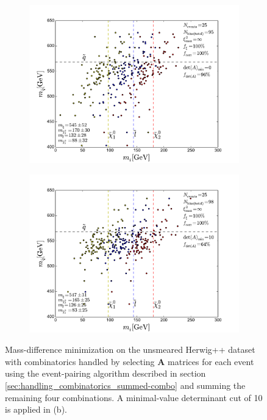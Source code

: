 \documentclass[twoside,english]{uiofysmaster}
\begin{document}
\begin{figure}[hbt]
	\centering
	\begin{subfigure}[b]{0.45\textwidth}
		\includegraphics[width=\textwidth]{figures/improving_combinatorics/herwigpp_nosmear_nodetAcut_A_matrix_algorithm_4combosum_TMP.pdf} 
		\caption{ }
		\label{fig:event-pair-A-selection_4combosum_a}
	\end{subfigure}
	\begin{subfigure}[b]{0.45\textwidth}
		\includegraphics[width=\textwidth]{figures/improving_combinatorics/herwigpp_nosmear_detAcut10_A_matrix_algorithm_4combosum_TMP.pdf}
		\caption{ }
		\label{fig:event-pair-A-selection_4combosum_b} 
	\end{subfigure}
	\caption{Mass-difference minimization on the unsmeared Herwig++ dataset with combinatorics handled by selecting $\mathbf{A}$ matrices for each event using the event-pairing algorithm described in section \ref{sec:handling_combinatorics_summed-combo} and summing the remaining four combinations. A minimal-value determinant cut of 10 is applied in (b).}
	\label{fig:event-pair-A-selection_4combosum}
\end{figure}
\end{document}
